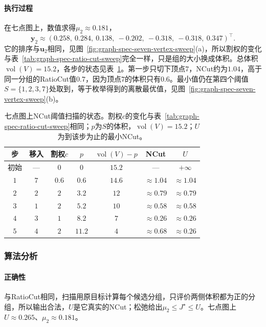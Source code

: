 \paragraph{执行过程}
在七点图上，数值求得$\mu_2\approx0.181$，
\[
 \bm y_2\approx(0.258,\ 0.284,\ 0.138,\ -0.202,\ -0.318,\ -0.318,\ 0.347)^{\top}.
\]
它的排序与$\bm u_2$相同，见图~\ref{fig:graph-spec-seven-vertex-sweep}(a)，所以割权的变化与表~\ref{tab:graph-spec-ratio-cut-sweep}完全一样，只是组的大小换成体积。总体积$\operatorname{vol}(V)=15.2$，各步的状态见表~\ref{tab:graph-spec-ncut-sweep}。第一步只切下顶点$7$，NCut约为$1.04$，高于同一分组的RatioCut值$0.7$，因为顶点$7$的体积只有$0.6$。最小值仍在第四个阈值$S=\{1,2,3,7\}$处取到，等于枚举得到的离散最优值，见图~\ref{fig:graph-spec-seven-vertex-sweep}(b)。

\begin{table}[!htb]
  \centering
  \caption{七点图上NCut阈值扫描的状态。割权$c$的变化与表~\ref{tab:graph-spec-ratio-cut-sweep}相同；$p$为$S$的体积，$\operatorname{vol}(V)=15.2$；$U$为到该步为止的最小NCut。}
  \label{tab:graph-spec-ncut-sweep}
  \small
  \begin{tabular}{@{}ccccccc@{}}
    \toprule
    步 & 移入 & 割权$c$ & $p$ & $\operatorname{vol}(V)-p$ & NCut & $U$ \\
    \midrule
    初始 & — & $0$ & $0$ & $15.2$ & — & $+\infty$ \\
    $1$ & $7$ & $0.6$ & $0.6$ & $14.6$ & $\approx1.04$ & $\approx1.04$ \\
    $2$ & $2$ & $2$ & $3.2$ & $12$ & $\approx0.79$ & $\approx0.79$ \\
    $3$ & $1$ & $2$ & $5.2$ & $10$ & $\approx0.58$ & $\approx0.58$ \\
    $4$ & $3$ & $1$ & $8.2$ & $7$ & $\approx0.26$ & $\approx0.26$ \\
    $5$ & $4$ & $2$ & $11.2$ & $4$ & $\approx0.68$ & $\approx0.26$ \\
    \bottomrule
  \end{tabular}
\end{table}

\subsubsection{算法分析}

\paragraph{正确性}
与RatioCut相同，扫描用原目标计算每个候选分组，只评价两侧体积都为正的分组，所以输出合法，$U$是它真实的NCut；松弛给出$\mu_2\leq J^\star\leq U$。七点图上$U\approx0.265$、$\mu_2\approx0.181$。

